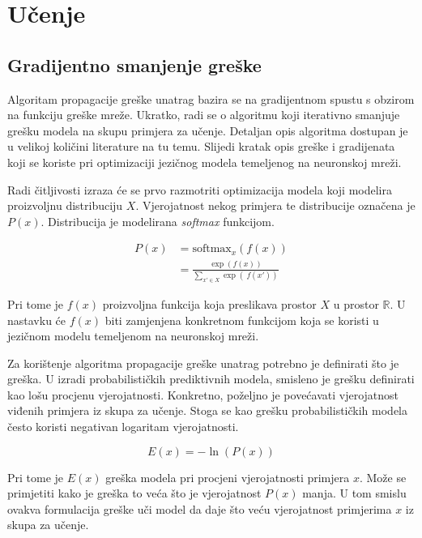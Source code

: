 \documentclass[times, utf8, diplomski, numeric]{fer}
\begin{document}
\section{Učenje}
\label{sec:nnet_training}

\subsection{Gradijentno smanjenje greške}

Algoritam propagacije greške unatrag bazira se na gradijentnom spustu s obzirom na funkciju greške mreže. Ukratko, radi se o algoritmu koji iterativno smanjuje grešku modela na skupu primjera za učenje. Detaljan opis algoritma dostupan je u velikoj količini literature na tu temu. Slijedi kratak opis greške i gradijenata koji se koriste pri optimizaciji jezičnog modela temeljenog na neuronskoj mreži.

Radi čitljivosti izraza će se prvo razmotriti optimizacija modela koji modelira proizvoljnu distribuciju $X$. Vjerojatnost nekog primjera te distribucije označena je $P(x)$. Distribucija je modelirana \textit{softmax} funkcijom.


\begin{equation}
\begin{split}
P(x) 
  & = \text{softmax}_{x}\left(f(x)\right) \\[1ex]
  & = \frac{\exp\left( f(x) \right)}{\sum_{x' \in X} \exp\left(\ f(x') \right)}
\end{split}
\end{equation}

Pri tome je $f(x)$ proizvoljna funkcija koja preslikava prostor $X$ u prostor $\mathbb{R}$. U nastavku će $f(x)$ biti zamjenjena konkretnom funkcijom koja se koristi u jezičnom modelu temeljenom na neuronskoj mreži.

Za korištenje algoritma propagacije greške unatrag potrebno je definirati što je greška. U izradi probabilističkih prediktivnih modela, smisleno je grešku definirati kao lošu procjenu vjerojatnosti. Konkretno, poželjno je povećavati vjerojatnost viđenih primjera iz skupa za učenje. Stoga se kao grešku probabilističkih modela često koristi negativan logaritam vjerojatnosti.

\begin{equation}
\label{eq:neg_log_p}
E(x) = - \ln \left( P(x) \right)
\end{equation}

Pri tome je $E(x)$ greška modela pri procjeni vjerojatnosti primjera $x$. Može se primjetiti kako je greška to veća što je vjerojatnost $P(x)$ manja. U tom smislu ovakva formulacija greške uči model da daje što veću vjerojatnost primjerima $x$ iz skupa za učenje.
\end{document}
